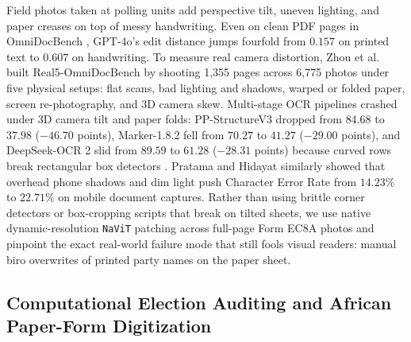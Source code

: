 \documentclass{article}
\begin{document}
Field photos taken at polling units add perspective tilt, uneven lighting, and paper creases on top of messy handwriting. Even on clean PDF pages in OmniDocBench \cite{ouyang2025omnidocbench}, GPT-4o's edit distance jumps fourfold from $0.157$ on printed text to $0.607$ on handwriting. To measure real camera distortion, Zhou et al.\ \cite{zhou2026real5omnidocbench} built Real5-OmniDocBench by shooting 1,355 pages across 6,775 photos under five physical setups: flat scans, bad lighting and shadows, warped or folded paper, screen re-photography, and 3D camera skew. Multi-stage OCR pipelines crashed under 3D camera tilt and paper folds: PP-StructureV3 dropped from $84.68$ to $37.98$ ($-46.70$ points), Marker-1.8.2 fell from $70.27$ to $41.27$ ($-29.00$ points), and DeepSeek-OCR 2 slid from $89.59$ to $61.28$ ($-28.31$ points) because curved rows break rectangular box detectors \cite{zhou2026real5omnidocbench}. Pratama and Hidayat \cite{icie2026shadow} similarly showed that overhead phone shadows and dim light push Character Error Rate from $14.23\%$ to $22.71\%$ on mobile document captures. Rather than using brittle corner detectors or box-cropping scripts that break on tilted sheets, we use native dynamic-resolution \texttt{NaViT} patching \cite{dehghani2023navit,bai2025qwen25vl} across full-page Form EC8A photos and pinpoint the exact real-world failure mode that still fools visual readers: manual biro overwrites of printed party names on the paper sheet.

\subsection{Computational Election Auditing and African Paper-Form Digitization}
\end{document}

